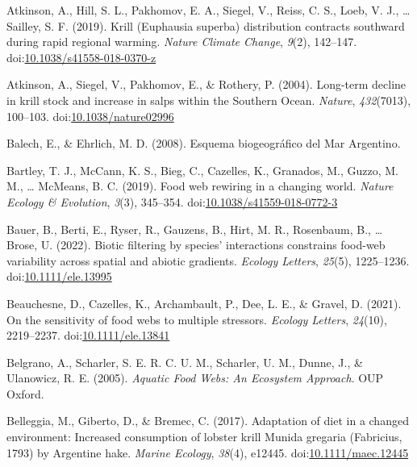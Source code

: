 \documentclass[
]{article}
\newlength{\cslhangindent}
\newlength{\cslentryspacingunit} %
\newenvironment{CSLReferences}[2] %
 {%
  \setlength{\parindent}{0pt}
  \ifodd #1
  \let\oldpar\par
  \def\par{\hangindent=\cslhangindent\oldpar}
  \fi
  \setlength{\parskip}{#2\cslentryspacingunit}
 }%
 {}
\begin{document}
\begin{CSLReferences}{1}{0}
\leavevmode{}%
Atkinson, A., Hill, S. L., Pakhomov, E. A., Siegel, V., Reiss, C. S.,
Loeb, V. J., \ldots{} Sailley, S. F. (2019). Krill ({Euphausia} superba)
distribution contracts southward during rapid regional warming.
\emph{Nature Climate Change}, \emph{9}(2), 142--147.
doi:\href{https://doi.org/10.1038/s41558-018-0370-z}{10.1038/s41558-018-0370-z}

\leavevmode{}%
Atkinson, A., Siegel, V., Pakhomov, E., \& Rothery, P. (2004). Long-term
decline in krill stock and increase in salps within the {Southern
Ocean}. \emph{Nature}, \emph{432}(7013), 100--103.
doi:\href{https://doi.org/10.1038/nature02996}{10.1038/nature02996}

\leavevmode{}%
Balech, E., \& Ehrlich, M. D. (2008). {Esquema biogeográfico del Mar
Argentino}.

\leavevmode{}%
Bartley, T. J., McCann, K. S., Bieg, C., Cazelles, K., Granados, M.,
Guzzo, M. M., \ldots{} McMeans, B. C. (2019). Food web rewiring in a
changing world. \emph{Nature Ecology \& Evolution}, \emph{3}(3),
345--354.
doi:\href{https://doi.org/10.1038/s41559-018-0772-3}{10.1038/s41559-018-0772-3}

\leavevmode{}%
Bauer, B., Berti, E., Ryser, R., Gauzens, B., Hirt, M. R., Rosenbaum,
B., \ldots{} Brose, U. (2022). Biotic filtering by species' interactions
constrains food-web variability across spatial and abiotic gradients.
\emph{Ecology Letters}, \emph{25}(5), 1225--1236.
doi:\href{https://doi.org/10.1111/ele.13995}{10.1111/ele.13995}

\leavevmode{}%
Beauchesne, D., Cazelles, K., Archambault, P., Dee, L. E., \& Gravel, D.
(2021). On the sensitivity of food webs to multiple stressors.
\emph{Ecology Letters}, \emph{24}(10), 2219--2237.
doi:\href{https://doi.org/10.1111/ele.13841}{10.1111/ele.13841}

\leavevmode{}%
Belgrano, A., Scharler, S. E. R. C. U. M., Scharler, U. M., Dunne, J.,
\& Ulanowicz, R. E. (2005). \emph{Aquatic {Food Webs}: {An Ecosystem
Approach}}. {OUP Oxford}.

\leavevmode{}%
Belleggia, M., Giberto, D., \& Bremec, C. (2017). Adaptation of diet in
a changed environment: {Increased} consumption of lobster krill {Munida}
gregaria ({Fabricius}, 1793) by {Argentine} hake. \emph{Marine Ecology},
\emph{38}(4), e12445.
doi:\href{https://doi.org/10.1111/maec.12445}{10.1111/maec.12445}


\end{CSLReferences}
\end{document}
